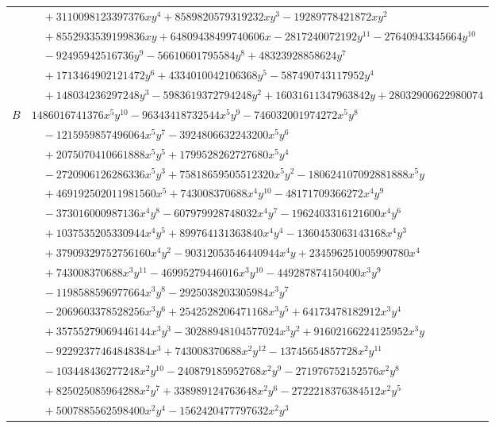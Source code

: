 \documentclass[11pt]{article}
\begin{document}
\begin{longtable}{@{}ll@{}}
 & $\quad +3110098123397376xy^{4}+8589820579319232xy^{3}-19289778421872xy^{2}$\\
 & $\quad +8552933539199836xy+64809438499740606x-2817240072192y^{11}-27640943345664y^{10}$\\
 & $\quad -92495942516736y^{9}-56610601795584y^{8}+48323928858624y^{7}$\\
 & $\quad +1713464902121472y^{6}+4334010042106368y^{5}-587490743117952y^{4}$\\
 & $\quad +148034236297248y^{3}-5983619372794248y^{2}+16031611347963842y+28032900622980074$\\
$B$ & $1486016741376x^{5}y^{10}-96343418732544x^{5}y^{9}-746032001974272x^{5}y^{8}$\\
 & $\quad -1215959857496064x^{5}y^{7}-3924806632243200x^{5}y^{6}$\\
 & $\quad +2075070410661888x^{5}y^{5}+1799528262727680x^{5}y^{4}$\\
 & $\quad -2720906126286336x^{5}y^{3}+75818659505512320x^{5}y^{2}-180624107092881888x^{5}y$\\
 & $\quad +469192502011981560x^{5}+743008370688x^{4}y^{10}-48171709366272x^{4}y^{9}$\\
 & $\quad -373016000987136x^{4}y^{8}-607979928748032x^{4}y^{7}-1962403316121600x^{4}y^{6}$\\
 & $\quad +1037535205330944x^{4}y^{5}+899764131363840x^{4}y^{4}-1360453063143168x^{4}y^{3}$\\
 & $\quad +37909329752756160x^{4}y^{2}-90312053546440944x^{4}y+234596251005990780x^{4}$\\
 & $\quad +743008370688x^{3}y^{11}-46995279446016x^{3}y^{10}-449287874150400x^{3}y^{9}$\\
 & $\quad -1198588596977664x^{3}y^{8}-2925038203305984x^{3}y^{7}$\\
 & $\quad -2069603378528256x^{3}y^{6}+2542528206471168x^{3}y^{5}+64173478182912x^{3}y^{4}$\\
 & $\quad +35755279069446144x^{3}y^{3}-30288948104577024x^{3}y^{2}+91602166224125952x^{3}y$\\
 & $\quad -92292377464848384x^{3}+743008370688x^{2}y^{12}-13745654857728x^{2}y^{11}$\\
 & $\quad -103448436277248x^{2}y^{10}-240879185952768x^{2}y^{9}-271976752152576x^{2}y^{8}$\\
 & $\quad +825025085964288x^{2}y^{7}+338989124763648x^{2}y^{6}-2722218376384512x^{2}y^{5}$\\
 & $\quad +5007885562598400x^{2}y^{4}-1562420477797632x^{2}y^{3}$\\

\end{longtable}
\end{document}
